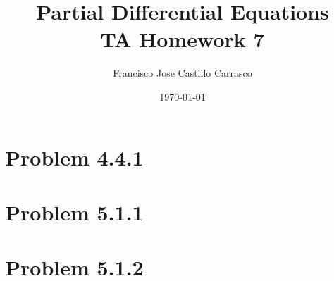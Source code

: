 




\title{Partial Differential Equations\\TA Homework 7}
\author{Francisco Jose Castillo Carrasco}
\date{\today}
\maketitle




\section*{Problem 4.4.1}

\newpage
\section*{Problem 5.1.1}

\newpage
\section*{Problem 5.1.2}


